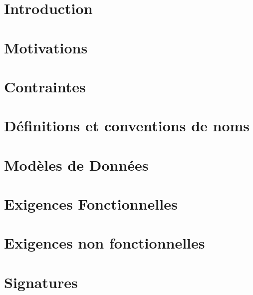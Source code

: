



\pagestyle{fancy} 






\tableofcontents
{}


\chapter{Introduction}


\chapter{Motivations}


\chapter{Contraintes}


\chapter{Définitions et conventions de noms}


\chapter{Modèles de Données}



\chapter{Exigences Fonctionnelles}


\chapter{Exigences non fonctionnelles}



\pagestyle{fancy} 





\appendix
{}
\listoffigures
\chapter*{Signatures}



